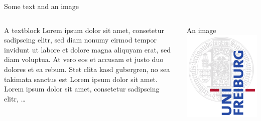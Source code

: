 \begin{frame}{Some text and an image}
\begin{columns}[T]
    \begin{column}{.5\textwidth}
     \begin{block}{A textblock}
		Lorem ipsum dolor sit amet, consetetur sadipscing elitr, sed diam nonumy eirmod tempor invidunt ut labore et dolore magna aliquyam erat, sed diam voluptua. At vero eos et accusam et justo duo dolores et ea rebum. Stet clita kasd gubergren, no sea takimata sanctus est Lorem ipsum dolor sit amet. Lorem ipsum dolor sit amet, consetetur sadipscing elitr, \dots
    \end{block}
    \end{column}
    \begin{column}{.5\textwidth}
    \begin{block}{An image}
    \includegraphics[width=\textwidth]{img/Logo1000px.png}
    \end{block}
    \end{column}
  \end{columns}
\end{frame}


